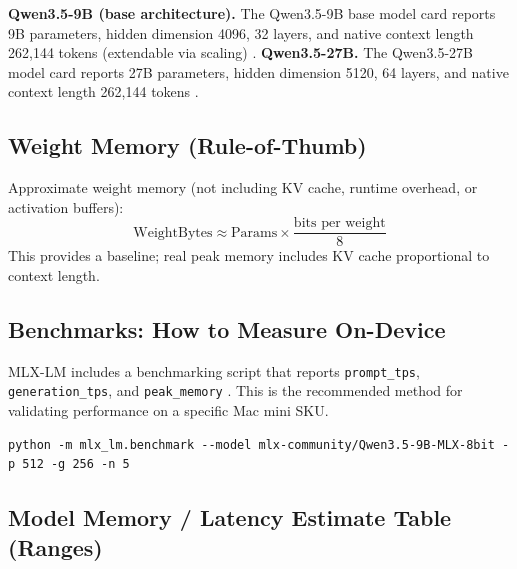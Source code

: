 \documentclass[11pt]{article}
\begin{document}
\textbf{Qwen3.5-9B (base architecture).} The Qwen3.5-9B base model card reports 9B parameters, hidden dimension 4096, 32 layers, and native context length 262{,}144 tokens (extendable via scaling) \cite{Qwen35_9B_BaseCard}.
\textbf{Qwen3.5-27B.} The Qwen3.5-27B model card reports 27B parameters, hidden dimension 5120, 64 layers, and native context length 262{,}144 tokens \cite{Qwen35_27B_Card}.

\subsection{Weight Memory (Rule-of-Thumb)}

Approximate weight memory (not including KV cache, runtime overhead, or activation buffers):
\[
\text{WeightBytes} \approx \text{Params} \times \frac{\text{bits per weight}}{8}
\]
This provides a baseline; real peak memory includes KV cache proportional to context length.

\subsection{Benchmarks: How to Measure On-Device}

MLX-LM includes a benchmarking script that reports \texttt{prompt\_tps}, \texttt{generation\_tps}, and \texttt{peak\_memory} \cite{MLXLM_BenchmarkPy}.
This is the recommended method for validating performance on a specific Mac mini SKU.

\begin{lstlisting}[style=base, caption={Run MLX-LM benchmark module (example)}]
python -m mlx_lm.benchmark --model mlx-community/Qwen3.5-9B-MLX-8bit -p 512 -g 256 -n 5
\end{lstlisting}

\subsection{Model Memory / Latency Estimate Table (Ranges)}
\end{document}
